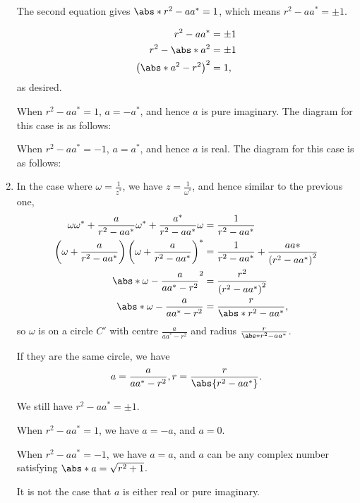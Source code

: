 \begin{enumerate}
          The second equation gives \(\abs*{r^2 - a a^*} = 1\), which means \(r^2 - a a^* = \pm 1\).

          \begin{align*}
              r^2 - a a^*                     & = \pm 1 \\
              r^2 - \abs*{a}^2                & = \pm 1 \\
              \left(\abs*{a}^2 - r^2\right)^2 & = 1,
          \end{align*}
          as desired.

          When \(r^2 - a a^* = 1\), \(a = - a^*\), and hence \(a\) is pure imaginary. The diagram for this case is as follows:
          \begin{center}
              
          \end{center}

          When \(r^2 - a a^* = -1\), \(a = a^*\), and hence \(a\) is real. The diagram for this case is as follows:
          \begin{center}
              
          \end{center}

    \item In the case where \(\omega = \frac{1}{z^*}\), we have \(z = \frac{1}{\omega^*}\), and hence similar to the previous one,
          \begin{align*}
              \omega \omega^* + \frac{a}{r^2 - a a^*} \omega^* + \frac{a^*}{r^2 - a a^*} \omega             & = \frac{1}{r^2 - a a^*}                                           \\
              \left(\omega + \frac{a}{r^2 - a a^{*}}\right) \left(\omega + \frac{a}{r^2 - a a^{*}}\right)^* & = \frac{1}{r^2 - a a^*} + \frac{a a*}{\left(r^2 - a a^*\right)^2} \\
              \abs*{\omega - \frac{a}{a a^{*} - r^2}}^2                                                     & = \frac{r^2}{\left(r^2 - a a^*\right)^2}                          \\
              \abs*{\omega - \frac{a}{a a^{*} - r^2}}                                                       & = \frac{r}{\abs*{r^2 - a a^*}},
          \end{align*}
          so \(\omega\) is on a circle \(C'\) with centre \(\frac{a}{a a^{*} - r^2}\) and radius \(\frac{r}{\abs*{r^2 - a a^*}}\).

          If they are the same circle, we have
          \[
              a = \frac{a}{a a^* - r^2}, r = \frac{r}{\abs{r^2 - a a^*}}.
          \]

          We still have \(r^2 - a a^* = \pm 1\).

          When \(r^2 - a a^* = 1\), we have \(a = -a\), and \(a = 0\).

          When \(r^2 - a a^* = -1\), we have \(a = a\), and \(a\) can be any complex number satisfying \(\abs*{a} = \sqrt{r^2 + 1}\).

          It is not the case that \(a\) is either real or pure imaginary.
\end{enumerate}